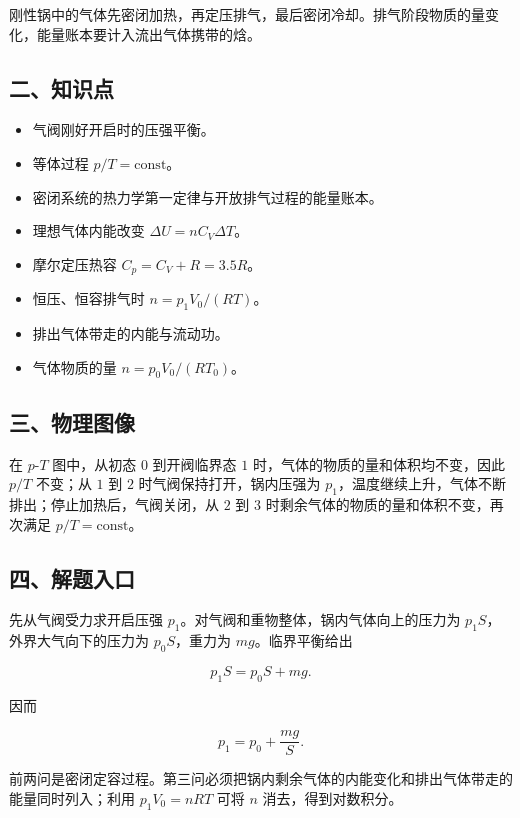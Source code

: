 \documentclass[12pt,a4paper,UTF8]{ctexart}
\newcommand{\tightlist}{\setlength{\itemsep}{0pt}\setlength{\parskip}{0pt}}
\begin{document}
刚性锅中的气体先密闭加热，再定压排气，最后密闭冷却。排气阶段物质的量变化，能量账本要计入流出气体携带的焓。

\subsection{二、知识点}\label{ux4e8cux77e5ux8bc6ux70b9-5}

\begin{itemize}
\tightlist
\item
  气阀刚好开启时的压强平衡。
\item
  等体过程 \(p/T=\text{const}\)。
\item
  密闭系统的热力学第一定律与开放排气过程的能量账本。
\item
  理想气体内能改变 \(\Delta U=nC_V\Delta T\)。
\item
  摩尔定压热容 \(C_p=C_V+R=3.5R\)。
\item
  恒压、恒容排气时 \(n=p_1V_0/(RT)\)。
\item
  排出气体带走的内能与流动功。
\item
  气体物质的量 \(n=p_0V_0/(RT_0)\)。
\end{itemize}

\subsection{三、物理图像}\label{ux4e09ux7269ux7406ux56feux50cf-5}

在 \(p\)-\(T\) 图中，从初态 \(0\) 到开阀临界态 \(1\)
时，气体的物质的量和体积均不变，因此 \(p/T\) 不变；从 \(1\) 到 \(2\)
时气阀保持打开，锅内压强为
\(p_1\)，温度继续上升，气体不断排出；停止加热后，气阀关闭，从 \(2\) 到
\(3\) 时剩余气体的物质的量和体积不变，再次满足 \(p/T=\text{const}\)。

\subsection{四、解题入口}\label{ux56dbux89e3ux9898ux5165ux53e3-5}

先从气阀受力求开启压强 \(p_1\)。对气阀和重物整体，锅内气体向上的压力为
\(p_1S\)，外界大气向下的压力为 \(p_0S\)，重力为 \(mg\)。临界平衡给出

\[p_1S=p_0S+mg.\]

因而

\[p_1=p_0+\frac{mg}{S}.\]

前两问是密闭定容过程。第三问必须把锅内剩余气体的内能变化和排出气体带走的能量同时列入；利用
\(p_1V_0=nRT\) 可将 \(n\) 消去，得到对数积分。
\end{document}
